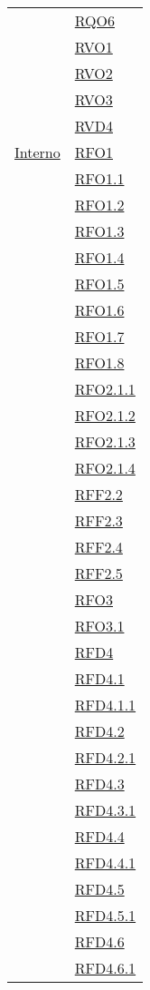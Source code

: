 \begin{longtable}{|>{\centering}m{5cm}|m{5cm}<{\centering}|}
& \hyperlink{RQO6}{RQO6}\\
& \hyperlink{RVO1}{RVO1}\\
& \hyperlink{RVO2}{RVO2}\\
& \hyperlink{RVO3}{RVO3}\\
& \hyperlink{RVD4}{RVD4}\\ \hline
\hyperlink{Interno}{Interno} & \hyperlink{RFO1}{RFO1}\\
& \hyperlink{RFO1.1}{RFO1.1}\\
& \hyperlink{RFO1.2}{RFO1.2}\\
& \hyperlink{RFO1.3}{RFO1.3}\\
& \hyperlink{RFO1.4}{RFO1.4}\\
& \hyperlink{RFO1.5}{RFO1.5}\\
& \hyperlink{RFO1.6}{RFO1.6}\\
& \hyperlink{RFO1.7}{RFO1.7}\\
& \hyperlink{RFO1.8}{RFO1.8}\\
& \hyperlink{RFO2.1.1}{RFO2.1.1}\\
& \hyperlink{RFO2.1.2}{RFO2.1.2}\\
& \hyperlink{RFO2.1.3}{RFO2.1.3}\\
& \hyperlink{RFO2.1.4}{RFO2.1.4}\\
& \hyperlink{RFF2.2}{RFF2.2}\\
& \hyperlink{RFF2.3}{RFF2.3}\\
& \hyperlink{RFF2.4}{RFF2.4}\\
& \hyperlink{RFF2.5}{RFF2.5}\\
& \hyperlink{RFO3}{RFO3}\\
& \hyperlink{RFO3.1}{RFO3.1}\\
& \hyperlink{RFD4}{RFD4}\\
& \hyperlink{RFD4.1}{RFD4.1}\\
& \hyperlink{RFD4.1.1}{RFD4.1.1}\\
& \hyperlink{RFD4.2}{RFD4.2}\\
& \hyperlink{RFD4.2.1}{RFD4.2.1}\\
& \hyperlink{RFD4.3}{RFD4.3}\\
& \hyperlink{RFD4.3.1}{RFD4.3.1}\\
& \hyperlink{RFD4.4}{RFD4.4}\\
& \hyperlink{RFD4.4.1}{RFD4.4.1}\\
& \hyperlink{RFD4.5}{RFD4.5}\\
& \hyperlink{RFD4.5.1}{RFD4.5.1}\\
& \hyperlink{RFD4.6}{RFD4.6}\\
& \hyperlink{RFD4.6.1}{RFD4.6.1}\\

\end{longtable}
